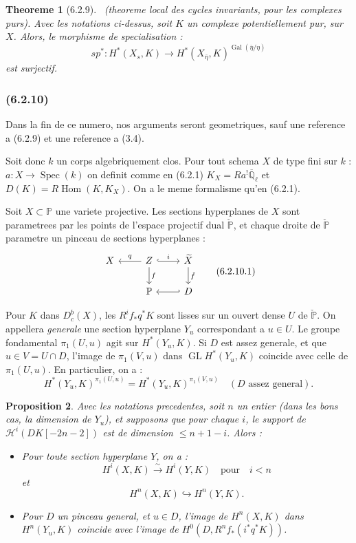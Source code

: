 \documentclass[12pt,a4paper]{article}
\theoremstyle{plain}
\newtheorem{theorem}{Theoreme}[section]
\newtheorem{proposition}[theorem]{Proposition}
\theoremstyle{definition}
\theoremstyle{remark}
\DeclareMathOperator{\Hom}{Hom}
\DeclareMathOperator{\Gal}{Gal}
\DeclareMathOperator{\Spec}{Spec}
\DeclareMathOperator{\GL}{GL}
\newcommand{\bbP}{\mathbb{P}}
\newcommand{\scrH}{\mathscr{H}}
\newcommand{\Qlb}{\overline{\mathbb{Q}}_\ell}
\begin{document}
\begin{theorem}[6.2.9]\ \textup{(theoreme local des cycles invariants, pour les complexes purs).}
Avec les notations ci-dessus, soit $K$ un complexe potentiellement pur, sur $X$. Alors, le morphisme de specialisation :
\[
sp^* : H^*(X_s, K) \to H^*(X_{\overline{\eta}}, K)^{\Gal(\overline{\eta}/\eta)}
\]
est surjectif.
\end{theorem}

\subsubsection*{\textup{(6.2.10)}}

Dans la fin de ce numero, nos arguments seront geometriques, sauf une reference a (6.2.9) et une reference a (3.4).

Soit donc $k$ un corps algebriquement clos. Pour tout schema $X$ de type fini sur $k$ : $a : X \to \Spec(k)$ on definit comme en (6.2.1) $K_X = Ra^! \Qlb$ et $D(K) = R\Hom(K, K_X)$. On a le meme formalisme qu'en (6.2.1).

Soit $X \subset \bbP$ une variete projective. Les sections hyperplanes de $X$ sont parametrees par les points de l'espace projectif dual $\check{\bbP}$, et chaque droite de $\check{\bbP}$ parametre un pinceau de sections hyperplanes :
\[
\begin{tikzcd}
X & Z \arrow[l, "q"'] \arrow[r, hook, "i"] \arrow[d, "f"] & \widetilde{X} \arrow[d, "\tilde{f}"] \\
& \bbP & D \arrow[l, hook']
\end{tikzcd}
\tag{6.2.10.1}
\]

Pour $K$ dans $D_c^b(X)$, les $R^i f_* q^* K$ sont lisses sur un ouvert dense $U$ de $\check{\bbP}$. On appellera \emph{generale} une section hyperplane $Y_u$ correspondant a $u \in U$. Le groupe fondamental $\pi_1(U, u)$ agit sur $H^*(Y_u, K)$. Si $D$ est assez generale, et que $u \in V = U \cap D$, l'image de $\pi_1(V, u)$ dans $\GL H^*(Y_u, K)$ coincide avec celle de $\pi_1(U, u)$. En particulier, on a :
\begin{equation}
H^*(Y_u, K)^{\pi_1(U, u)} = H^*(Y_u, K)^{\pi_1(V, u)} \quad (D \text{ assez general}).
\end{equation}

\begin{proposition}
Avec les notations precedentes, soit $n$ un entier (dans les bons cas, la dimension de $Y_u$), et supposons que pour chaque $i$, le support de $\scrH^i(DK[-2n-2])$ est de dimension $\leq n + 1 - i$. Alors :
\begin{itemize}
\item[(i)] Pour toute section hyperplane $Y$, on a :
\[
H^i(X, K) \xrightarrow{\sim} H^i(Y, K) \quad \text{pour} \quad i < n
\]
et
\[
H^n(X, K) \hookrightarrow H^n(Y, K).
\]
\item[(ii)] Pour $D$ un pinceau general, et $u \in D$, l'image de $H^n(X, K)$ dans $H^n(Y_u, K)$ coincide avec l'image de $H^0(D, R^n f_*(i^* q^* K))$.
\end{itemize}
\end{proposition}
\end{document}
